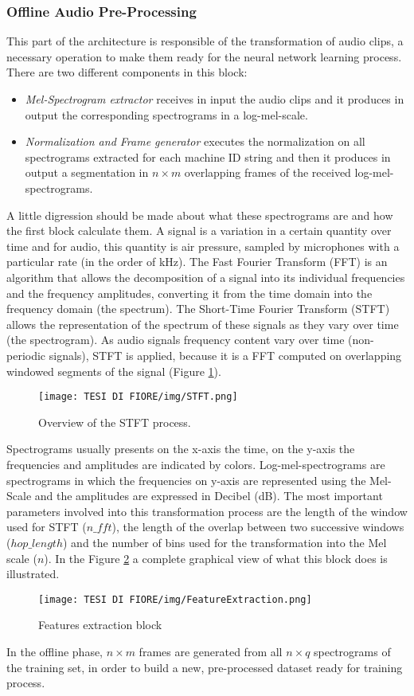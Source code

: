 \subsubsection{Offline Audio Pre-Processing}
This part of the architecture is responsible of the transformation of audio clips, a necessary operation to make them ready for the neural network learning process. There are two different components in this block:
\begin{itemize}
    \item {\textit{Mel-Spectrogram extractor} receives in input the audio clips and it produces in output the corresponding spectrograms in a log-mel-scale.}
    \item {\textit{Normalization and Frame generator} executes the normalization on all spectrograms extracted for each machine ID string and then it produces in output a segmentation in $n \times m$ overlapping frames of the received log-mel-spectrograms.  }
\end{itemize}
A little digression should be made about what these spectrograms are and how the first block calculate them. A signal is a variation in a certain quantity over time and for audio, this quantity is air pressure, sampled by microphones with a particular rate (in the order of kHz). The Fast Fourier Transform (FFT) is an algorithm that allows the decomposition of a signal into its individual frequencies and the frequency amplitudes, converting it from the time domain into the frequency domain (the spectrum). The Short-Time Fourier Transform (STFT) allows the representation of the spectrum of these signals as they vary over time (the spectrogram). As audio signals frequency content vary over time (non-periodic signals), STFT is applied, because it is a FFT computed on overlapping windowed segments of the signal (Figure \ref{sftf}).\\
\begin{figure}[ht]
\texttt{[image: TESI DI FIORE/img/STFT.png]}
\centering
\caption{Overview of the STFT process.}
\label{sftf}
\end{figure}
Spectrograms usually presents on the x-axis the time, on the y-axis the frequencies and amplitudes are indicated by colors. Log-mel-spectrograms are spectrograms in which the frequencies on y-axis are represented using the Mel-Scale and the amplitudes are expressed in Decibel (dB). The most important parameters involved into this transformation process are the length of the window used for STFT ($n\_fft$), the length of the overlap between two successive windows ($hop\_length$) and the number of bins used for the transformation into the Mel scale ($n$).
In the Figure \ref{features-extraction} a complete graphical view of what this block does is illustrated.
\begin{figure}[ht]
\texttt{[image: TESI DI FIORE/img/FeatureExtraction.png]}
\centering
\caption{Features extraction block}
\label{features-extraction}
\end{figure}
In the offline phase, $n \times m$ frames are generated from all $n \times q$ spectrograms of the training set, in order to build a new, pre-processed dataset ready for training process.
